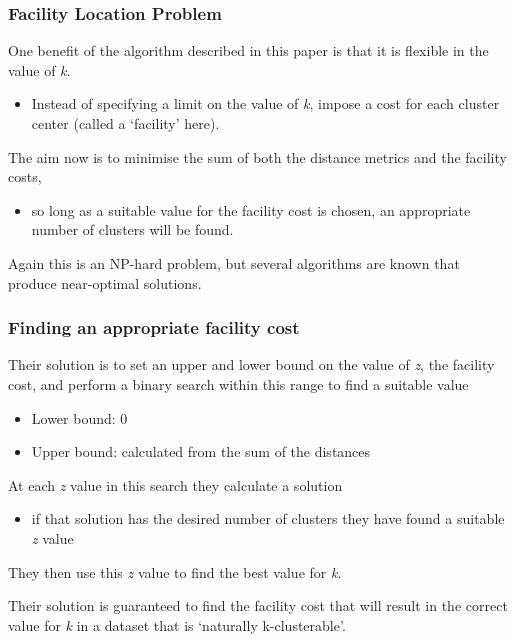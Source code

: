\documentclass{beamer}
\begin{document}

\frame
    {
      \frametitle{Facility Location Problem}

      One benefit of the algorithm described in this paper is that it is
      flexible in the value of {\em k}.
      \begin{itemize}
      \item Instead of specifying a limit on the value of {\em k}, impose
        a cost for each cluster center (called a `facility' here).
      \end{itemize}

      \bigskip
      The aim now is to minimise the sum of both the distance metrics and
      the facility costs,
      \begin{itemize}
      \item so long as a suitable value for the facility cost is
        chosen, an appropriate number of clusters will be found.
      \end{itemize}

      \bigskip
      Again this is an NP-hard problem, but several algorithms are
      known that produce near-optimal solutions.
      
    }

\frame
    {
      \frametitle{Finding an appropriate facility cost}

      Their solution is to set an upper and lower bound on the value of {\em z},
      the facility cost, and perform a binary search within this range to
      find a suitable value
      \begin{itemize}
      \item Lower bound: 0
      \item Upper bound: calculated from the sum of the distances
      \end{itemize}

      \bigskip
      At each {\em z} value in this search they calculate a solution
      \begin{itemize}
      \item if that solution has the desired number of clusters they
        have found a suitable {\em z} value
      \end{itemize}
      They then use this {\em z} value to find the best value for {\em k}.

      \bigskip
      Their solution is guaranteed to find the facility cost that will
      result in the correct value for {\em k} in a dataset that is
      `naturally k-clusterable'.

      
    }
\end{document}
